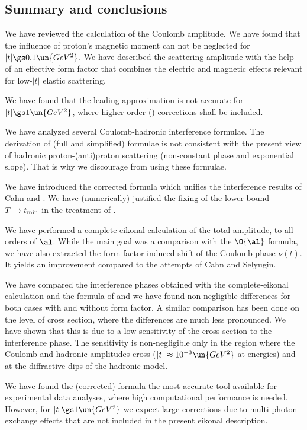 \subsection[int sum]{Summary and conclusions}

We have reviewed the calculation of the Coulomb amplitude. We have found that the influence of proton's magnetic moment can not be neglected for $|t| \gs 0.1\un{GeV^2}$. We have described the scattering amplitude with the help of an effective form factor that combines the electric and magnetic effects relevant for low-$|t|$ elastic scattering.

We have found that the leading  approximation is not accurate for $|t| \gs 1\un{GeV^2}$, where higher order () corrections shall be included.

We have analyzed several Coulomb-hadronic interference formulae. The derivation of (full and simplified) \WaY{} formulae is not consistent with the present view of hadronic proton-(anti)proton scattering (non-constant phase and exponential slope). That is why we discourage from using these formulae.

We have introduced the corrected \KaL{} formula which unifies the interference results of Cahn and \KaL. We have (numerically) justified the fixing of the lower bound $T\to t_{\rm min}$ in the treatment of \KaL{}.

We have performed a complete-eikonal calculation of the total amplitude, to all orders of $\al$. While the main goal was a comparison with the $\O{\al}$ \KaL{} formula, we have also extracted the form-factor-induced shift of the Coulomb phase $\nu(t)$. It yields an improvement compared to the attempts of Cahn and Selyugin.

We have compared the interference phases obtained with the complete-eikonal calculation and the formula of \KaL{} and we have found non-negligible differences for both cases with and without form factor. A similar comparison has been done on the level of cross section, where the differences are much less pronounced. We have shown that this is due to a low sensitivity of the cross section to the interference phase. The sensitivity is non-negligible only in the region where the Coulomb and hadronic amplitudes cross ($|t|\approx 10^{-3}\un{GeV^2}$ at  energies) and at the diffractive dips of the hadronic model.

We have found the (corrected) \KaL{} formula the most accurate tool available for experimental data analyses, where high computational performance is needed. However, for $|t| \gs 1\un{GeV^2}$ we expect large corrections due to multi-photon exchange effects that are not included in the present eikonal description.
